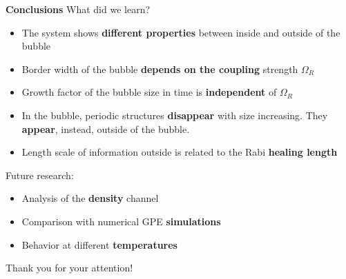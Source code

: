 \documentclass[aspectratio=169]{beamer}
\newcommand{\backupbegin}{
    \newcounter{finalframe}
    \setcounter{finalframe}{\value{framenumber}}
}
\newcommand{\backupend}{
    \setcounter{framenumber}{\value{finalframe}}
}
\begin{document}
\begin{frame}{\textbf{Conclusions}}
  What did we learn?
  \begin{itemize}
    \item The system shows \textbf{different properties} between inside and outside of the bubble
    \item Border width of the bubble \textbf{depends on the coupling} strength $\Omega_R$
    \item Growth factor of the bubble size in time is \textbf{independent} of $\Omega_R$
    \item In the bubble, periodic structures \textbf{disappear} with size increasing. They \textbf{appear}, instead, outside of the bubble.
    \item Length scale of information outside is related to the Rabi \textbf{healing length}
  \end{itemize}
  \pause
  Future research:
  \begin{itemize}
    \item Analysis of the \textbf{density} channel
    \item Comparison with numerical GPE \textbf{simulations}
    \item Behavior at different \textbf{temperatures}
  \end{itemize}
\end{frame}

\begin{frame}
  \huge
  Thank you for your attention!
\end{frame}

  
\end{document}
